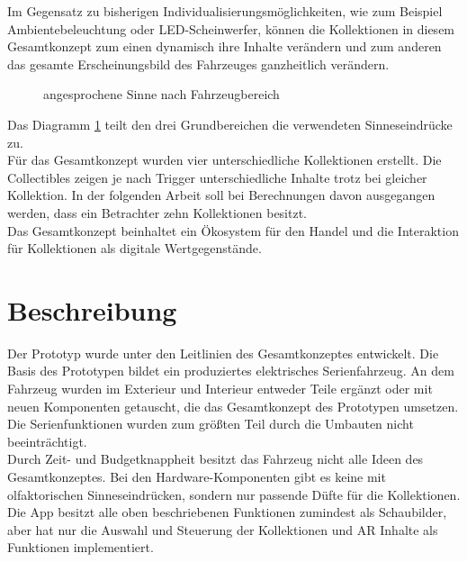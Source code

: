 Im Gegensatz zu bisherigen Individualisierungsmöglichkeiten, wie zum Beispiel Ambientebeleuchtung oder LED-Scheinwerfer, können die Kollektionen in diesem Gesamtkonzept zum einen dynamisch ihre Inhalte verändern und zum anderen das gesamte Erscheinungsbild des Fahrzeuges ganzheitlich verändern. \\
\begin{figure}[hbt]
	\centering
	
	\caption[angesprochene Sinne nach Fahrzeugbereich]{angesprochene Sinne nach Fahrzeugbereich}
	\label{fig:sinneeinteilung}
\end{figure}
Das Diagramm \ref{fig:sinneeinteilung} teilt den drei Grundbereichen die verwendeten Sinneseindrücke zu. \\
Für das Gesamtkonzept wurden vier unterschiedliche Kollektionen erstellt. Die Collectibles zeigen je nach Trigger unterschiedliche Inhalte trotz bei gleicher Kollektion. In der folgenden Arbeit soll bei Berechnungen davon ausgegangen werden, dass ein Betrachter zehn Kollektionen besitzt. \\
Das Gesamtkonzept beinhaltet ein Ökosystem für den Handel und die Interaktion für Kollektionen als digitale Wertgegenstände.
\section{Beschreibung}
Der Prototyp wurde unter den Leitlinien des Gesamtkonzeptes entwickelt. Die Basis des Prototypen bildet ein produziertes elektrisches Serienfahrzeug. An dem Fahrzeug wurden im Exterieur und Interieur entweder Teile ergänzt oder mit neuen Komponenten getauscht, die das Gesamtkonzept des Prototypen umsetzen. Die Serienfunktionen wurden zum größten Teil durch die Umbauten nicht beeinträchtigt.\\
Durch Zeit- und Budgetknappheit besitzt das Fahrzeug nicht alle Ideen des Gesamtkonzeptes. Bei den Hardware-Komponenten gibt es keine mit olfaktorischen Sinneseindrücken, sondern nur passende Düfte für die Kollektionen. Die App besitzt alle oben beschriebenen Funktionen zumindest als Schaubilder, aber hat nur die Auswahl und Steuerung der Kollektionen und AR Inhalte als Funktionen implementiert.

